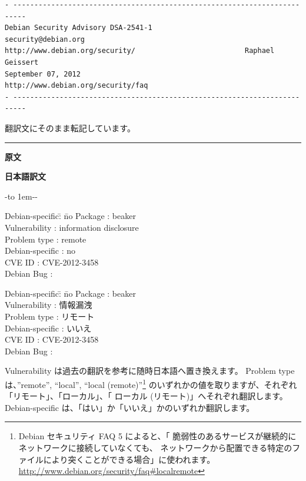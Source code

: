 \documentclass[mingoth,a4paper]{jsarticle}
\begin{document}
\pagebreak[2]

\par
\begin{verbatim}
- -------------------------------------------------------------------------
Debian Security Advisory DSA-2541-1                   security@debian.org
http://www.debian.org/security/                          Raphael Geissert
September 07, 2012                     http://www.debian.org/security/faq
- -------------------------------------------------------------------------
\end{verbatim}

翻訳文にそのまま転記しています。\par
\vspace*{1ex}
\pagebreak[2]
\clearpage

\hrule
{}\par
\parbox[t]{0.48\linewidth}{{\bf 原文}}\hfil \parbox{0.48\linewidth}{\bf 日本語訳文}\par\vspace{0.1em}

-\leaders\hbox to 1em{\hss{}-\hss}\hfill -\par
\parbox[t]{0.48\linewidth}{
\begin{tabbing}
Debian-specific\= : \= no\kill
Package        \> : \>  beaker \\
Vulnerability  \> : \>  information disclosure\\
Problem type   \> : \>  remote\\
Debian-specific\> : \>  no\\
CVE ID         \> : \> CVE-2012-3458 \\
Debian Bug     \> : \\
\end{tabbing}
}\hfil \vrule \hfil
\parbox[t]{0.48\linewidth}{
\begin{tabbing}
Debian-specific\= : \= no\kill
Package        \> : \>  beaker \\
Vulnerability  \> : \>  情報漏洩\\
Problem type   \> : \>  リモート\\
Debian-specific\> : \>  いいえ\\
CVE ID         \> : \> CVE-2012-3458\\
Debian Bug     \> : \\
\end{tabbing}
}\hfill


Vulnerability は過去の翻訳を参考に随時日本語へ置き換えます。
Problem type は、''remote'', ``local'', ``local (remote)''\footnote{Debian セキュリティ FAQ 5 によると、「 脆弱性のあるサービスが継続的にネットワークに接続していなくても、 ネットワークから配置できる特定のファイルにより突くことができる場合」に使われます。\url{http://www.debian.org/security/faq\#localremote}} のいずれかの値を取りますが、それぞれ「リモート」、「ローカル」、「 ローカル (リモート)」へそれぞれ翻訳します。
Debian-specific は、「はい」か「いいえ」かのいずれか翻訳します。
\end{document}
